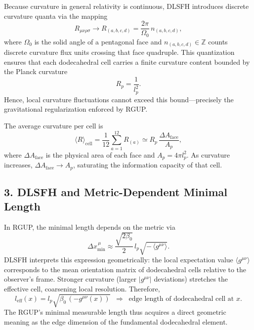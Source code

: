 \documentclass[11pt,oneside]{book}
\numberwithin{equation}{chapter}
\newcommand{\betaz}{\beta_0}
\begin{document}
Because curvature in general relativity is continuous, DLSFH introduces discrete curvature quanta via the mapping
\begin{equation}
R_{\mu\nu\rho\sigma} \longrightarrow R_{(a,b,c,d)} = 
\frac{2\pi}{\Omega_0}\,n_{(a,b,c,d)},
\end{equation}
where $\Omega_0$ is the solid angle of a pentagonal face and $n_{(a,b,c,d)}\in\mathbb{Z}$ counts discrete curvature flux units crossing that face quadruple.  
This quantization ensures that each dodecahedral cell carries a finite curvature content bounded by the Planck curvature
\begin{equation}
R_p = \frac{1}{l_p^2}.
\end{equation}
Hence, local curvature fluctuations cannot exceed this bound—precisely the gravitational regularization enforced by RGUP.

The average curvature per cell is
\begin{equation}
\langle R \rangle_{\text{cell}} = \frac{1}{12}\sum_{a=1}^{12} R_{(a)} 
\simeq R_p\,\frac{\Delta A_{\text{face}}}{A_p},
\end{equation}
where $\Delta A_{\text{face}}$ is the physical area of each face and $A_p = 4\pi l_p^2$.  
As curvature increases, $\Delta A_{\text{face}}\!\rightarrow\!A_p$, saturating the information capacity of that cell.

\subsection*{3. DLSFH and Metric-Dependent Minimal Length}

In RGUP, the minimal length depends on the metric via
\begin{equation}
\Delta x_{\min}^{\,\mu} \approx 
\frac{\sqrt{2\betaz}}{2}\,l_p\sqrt{-\,\langle g^{\mu\nu}\rangle}.
\end{equation}
DLSFH interprets this expression geometrically:  
the local expectation value $\langle g^{\mu\nu}\rangle$ corresponds to the mean orientation matrix of dodecahedral cells relative to the observer’s frame.  
Stronger curvature (larger $|g^{\mu\nu}|$ deviations) stretches the effective cell, coarsening local resolution.  
Therefore,
\begin{equation}
l_{\text{eff}}(x) = l_p \sqrt{\betaz\,(-g^{\mu\nu}(x))} 
\;\;\Rightarrow\;\;
\text{edge length of dodecahedral cell at }x.
\end{equation}
The RGUP’s minimal measurable length thus acquires a direct geometric meaning as the edge dimension of the fundamental dodecahedral element.
\end{document}

